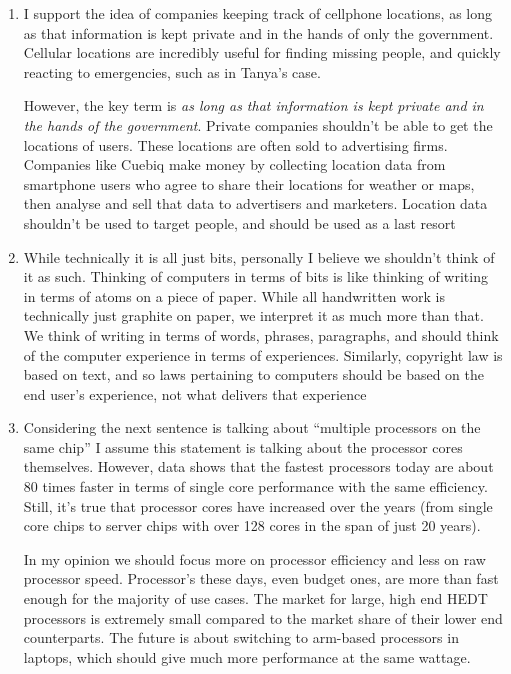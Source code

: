 \documentclass{scrartcl}
\begin{document}
\begin{enumerate}
\item I support the idea of companies keeping track of cellphone locations, as long
as that information is kept private and in the hands of only the government.
Cellular locations are incredibly useful for finding missing people, and
quickly reacting to emergencies, such as in Tanya's case.

However, the key term is \emph{as long as that information is kept private and in
the hands of the government}. Private companies shouldn't be able to get the
locations of users. These locations are often sold to advertising firms.
Companies like Cuebiq make money by collecting location data from smartphone
users who agree to share their locations for weather or maps, then analyse
and sell that data to advertisers and marketers. Location data shouldn't be  used to target people, and should be used as a last resort

\item While technically it is all just bits, personally I believe we shouldn't
think of it as such. Thinking of computers in terms of bits is like thinking
of writing in terms of atoms on a piece of paper. While all handwritten work
is technically just graphite on paper, we interpret it as much more than
that. We think of writing in terms of words, phrases, paragraphs, and should
think of the computer experience in terms of experiences. Similarly,
copyright law is based on text, and so laws pertaining to computers should be
based on the end user's experience, not what delivers that experience

\item Considering the next sentence is talking about ``multiple processors on the
same chip'' I assume this statement is talking about the processor cores
themselves. However, data shows that the fastest processors today are about
80 times faster in terms of single core performance with the same efficiency.
Still, it's true that processor cores have increased over the years (from
single core chips to server chips with over 128 cores in the span of just 20
years).

In my opinion we should focus more on processor efficiency and less on raw
processor speed. Processor's these days, even budget ones, are more than fast
enough for the majority of use cases. The market for large, high end HEDT
processors is extremely small compared to the market share of their lower end
counterparts. The future is about switching to arm-based processors in
laptops, which should give much more performance at the same wattage.


\end{enumerate}
\end{document}

